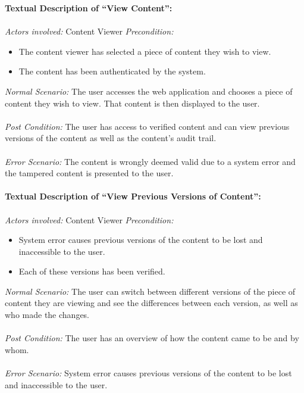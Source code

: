 \newpage
\noindent
\textbf{Textual Description of “View Content”:} \\ \\
\textit{Actors involved:} Content Viewer
\textit{Precondition:} 
	\begin{itemize}
		\item The content viewer has selected a piece of content they wish to view.
		\item The content has been authenticated by the system. 
	\end{itemize}
\textit{Normal Scenario:} The user accesses the web application and chooses a piece of content 
					      they wish to view. That content is then displayed to the user. \\ \\
\textit{Post Condition:} The user has access to verified content and can view previous versions 
						 of the content as well as the content’s audit trail. \\ \\
\textit{Error Scenario:} The content is wrongly deemed valid due to a system error and 
						 the tampered content is presented to the user. \\ \\

\noindent
\textbf{Textual Description of “View Previous Versions of Content”:} \\ \\
\textit{Actors involved:} Content Viewer
\textit{Precondition:} 
	\begin{itemize}
		\item System error causes previous versions of the content to be lost and inaccessible to the user. 
		\item Each of these versions has been verified.
	\end{itemize}
\textit{Normal Scenario:} The user can switch between different versions of the piece of content 
						  they are viewing and see the differences between each version, 
						  as well as who made the changes. \\ \\
\textit{Post Condition:} The user has an overview of how the content came to be and by whom. \\ \\
\textit{Error Scenario:} System error causes previous versions of the content to be lost and inaccessible to the user.\\ \\

